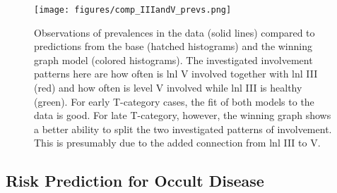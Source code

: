 \documentclass[twocolumn]{aastex631}
\begin{document}
\begin{figure}
    \begin{centering}
        \texttt{[image: figures/comp\_IIIandV\_prevs.png]}
        \caption{Observations of prevalences in the data (solid lines) compared to predictions from the base (hatched histograms) and the winning graph model (colored histograms). The investigated involvement patterns here are how often is \gls{lnl} V involved together with \gls{lnl} III (red) and how often is level V involved while \gls{lnl} III is healthy (green). For early T-category cases, the fit of both models to the data is good. For late T-category, however, the winning graph shows a better ability to split the two investigated patterns of involvement. This is presumably due to the added connection from \gls{lnl} III to V.}
        \label{fig:IIIandV_prevs}
    \end{centering}
\end{figure}


\subsection{Risk Prediction for Occult Disease}
\label{subsec:results:risk_prediction}

\begin{figure}
\end{figure}
\end{document}
